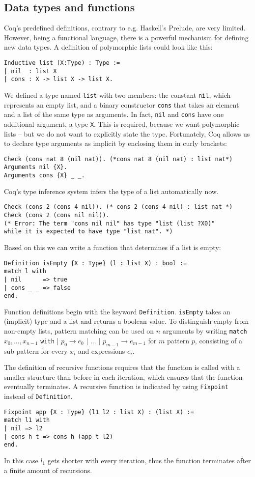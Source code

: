\documentclass{scrreprt}
\newcommand{\coqinline}[1]{\texttt{#1}}
\begin{document}
\subsection{Data types and functions}
Coq's predefined definitions, contrary to e.g. Haskell's Prelude, are very limited. However, being a functional language, there is a powerful mechanism for defining new data types. A definition of polymorphic lists could look like this:
\begin{verbatim}
Inductive list (X:Type) : Type :=
| nil  : list X
| cons : X -> list X -> list X.
\end{verbatim}
We defined a type named \coqinline{list} with two members: the constant \coqinline{nil}, which represents an empty list, and a binary constructor \coqinline{cons} that takes an element and a list of the same type as arguments. In fact, \coqinline{nil} and \coqinline{cons} have one additional argument, a type \coqinline{X}. This is required, because we want polymorphic lists -- but we do not want to explicitly state the type. Fortunately, Coq allows us to declare type arguments as implicit by enclosing them in curly brackets:
\begin{verbatim}
Check (cons nat 8 (nil nat)). (*cons nat 8 (nil nat) : list nat*)
Arguments nil {X}.
Arguments cons {X} _ _.
\end{verbatim}
Coq's type inference system infers the type of a list automatically now.
\begin{verbatim}
Check (cons 2 (cons 4 nil)). (* cons 2 (cons 4 nil) : list nat *)
Check (cons 2 (cons nil nil)). 
(* Error: The term "cons nil nil" has type "list (list ?X0)"
while it is expected to have type "list nat". *)
\end{verbatim}
Based on this we can write a function that determines if a list is empty:
\begin{verbatim}
Definition isEmpty {X : Type} (l : list X) : bool := 
match l with
| nil      => true
| cons _ _ => false
end.
\end{verbatim}
Function definitions begin with the keyword \coqinline{Definition}. \coqinline{isEmpty} takes an (implicit) type and a list and returns a boolean value.
To distinguish empty from non-empty lists, pattern matching can be used on $n$ arguments by writing \coqinline{match} $x_{0},...,x_{n-1}$ \coqinline{with} | $p_{0} \rightarrow e_{0}$ | ... | $p_{m-1} \rightarrow e_{m-1}$ for $m$ pattern $p$, consisting of a sub-pattern for every $x_{i}$ and expressions $e_{i}$.

The definition of recursive functions requires that the function is called with a smaller structure than before in each iteration, which ensures that the function eventually terminates. A recursive function is indicated by using \coqinline{Fixpoint} instead of \coqinline{Definition}.
\begin{verbatim}
Fixpoint app {X : Type} (l1 l2 : list X) : (list X) :=
match l1 with
| nil => l2
| cons h t => cons h (app t l2)
end.
\end{verbatim}
In this case $l_{1}$ gets shorter with every iteration, thus the function terminates after a finite amount of recursions. 
\end{document}
